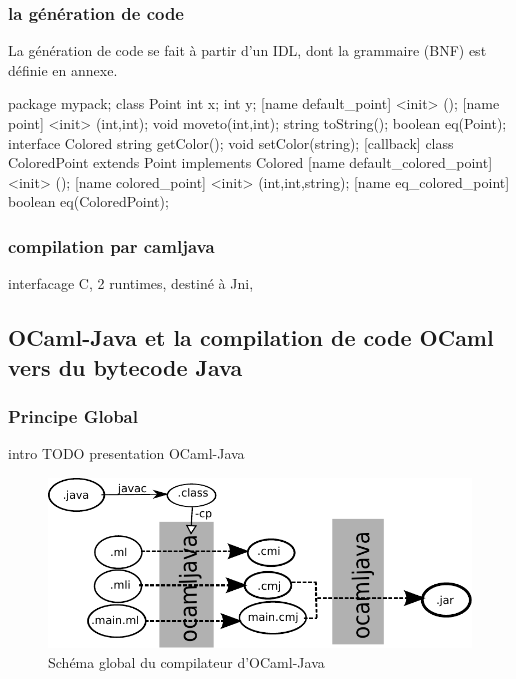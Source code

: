 \documentclass[a4paper, 11pt, notitlepage]{article}
\begin{document}
\newpage

\subsubsection{la génération de code}
La génération de code se fait à partir d'un IDL, dont la grammaire
(BNF) est définie en annexe.
\begin{idlEx}
package mypack;
class Point {
  int x;
  int y; 
  [name default_point] <init> ();
  [name point] <init> (int,int);
  void moveto(int,int);
  string toString();
  boolean eq(Point);
}
interface Colored {
  string getColor();
  void setColor(string);
}
[callback] class ColoredPoint extends Point implements Colored {
  [name default_colored_point] <init> ();
  [name colored_point] <init> (int,int,string);
  [name eq_colored_point] boolean eq(ColoredPoint);
}
\end{idlEx}
\subsubsection{compilation par camljava}
interfacage C, 2 runtimes, destiné à Jni, 


















\newpage
\subsection{OCaml-Java et la compilation de code OCaml vers du bytecode Java}

\subsubsection{Principe Global}
intro TODO presentation OCaml-Java

\begin{figure}[h]
  \centering
  \includegraphics{schemaOCamlJava.pdf}
  \caption{Schéma global du compilateur d'OCaml-Java}
\end{figure}
\end{document}
